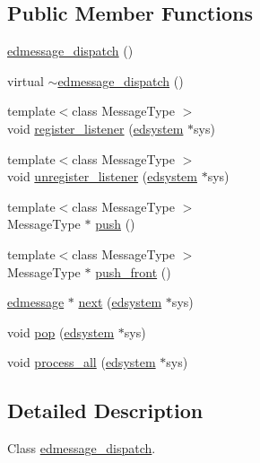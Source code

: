 \subsection*{Public Member Functions}
\begin{DoxyCompactItemize}
\item 
\hyperlink{classedmessage__dispatch_a8eef1480309ce6b3439b649ed5e94fdc}{edmessage\-\_\-dispatch} ()
\item 
virtual \hyperlink{classedmessage__dispatch_ad00ef6c590f2d0aa56ce4ba0c42d8a20}{$\sim$edmessage\-\_\-dispatch} ()
\item 
{\footnotesize template$<$class Message\-Type $>$ }\\void \hyperlink{classedmessage__dispatch_a72e810fc8be900d420c5bc4e4e7ed0fb}{register\-\_\-listener} (\hyperlink{classedsystem}{edsystem} $\ast$sys)
\item 
{\footnotesize template$<$class Message\-Type $>$ }\\void \hyperlink{classedmessage__dispatch_af2e13b40c33728a19f189bc8dd222d3b}{unregister\-\_\-listener} (\hyperlink{classedsystem}{edsystem} $\ast$sys)
\item 
{\footnotesize template$<$class Message\-Type $>$ }\\Message\-Type $\ast$ \hyperlink{classedmessage__dispatch_ab0a4b47e7c90abea073511dc6d72e338}{push} ()
\item 
{\footnotesize template$<$class Message\-Type $>$ }\\Message\-Type $\ast$ \hyperlink{classedmessage__dispatch_acc783ed63b9f2dfe3ddb278d4e7518de}{push\-\_\-front} ()
\item 
\hyperlink{structedmessage}{edmessage} $\ast$ \hyperlink{classedmessage__dispatch_a62ce8628df9d3bc4b62831514ce586b6}{next} (\hyperlink{classedsystem}{edsystem} $\ast$sys)
\item 
void \hyperlink{classedmessage__dispatch_a498a009d4903b42a080ad002021992c3}{pop} (\hyperlink{classedsystem}{edsystem} $\ast$sys)
\item 
void \hyperlink{classedmessage__dispatch_aae298910744e7f59cbf0d1e87b9d7fc2}{process\-\_\-all} (\hyperlink{classedsystem}{edsystem} $\ast$sys)
\end{DoxyCompactItemize}


\subsection{Detailed Description}
Class \hyperlink{classedmessage__dispatch}{edmessage\-\_\-dispatch}. 

